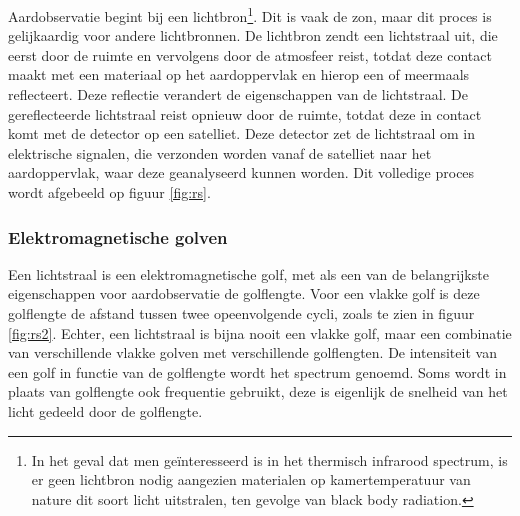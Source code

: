 \documentclass[12pt]{report}
\begin{document}
Aardobservatie begint bij een lichtbron\footnote{In het geval dat men ge\"interesseerd is in het thermisch infrarood spectrum, is er geen lichtbron nodig aangezien materialen op kamertemperatuur van nature dit soort licht uitstralen, ten gevolge van black body radiation.}. Dit is vaak de zon, maar dit proces is gelijkaardig voor andere lichtbronnen. De lichtbron zendt een lichtstraal uit, die eerst door de ruimte en vervolgens door de atmosfeer reist, totdat deze contact maakt met een materiaal op het aardoppervlak en hierop een of meermaals reflecteert. Deze reflectie verandert de eigenschappen van de lichtstraal. De gereflecteerde lichtstraal reist opnieuw door de ruimte, totdat deze in contact komt met de detector op een satelliet. Deze detector zet de lichtstraal om in elektrische signalen, die verzonden worden vanaf de satelliet naar het aardoppervlak, waar deze geanalyseerd kunnen worden. Dit volledige proces wordt afgebeeld op figuur \ref{fig:rs}. 




\subsubsection{Elektromagnetische golven}
Een lichtstraal is een elektromagnetische golf, met als een van de belangrijkste eigenschappen voor aardobservatie de golflengte. Voor een vlakke golf is deze golflengte de afstand tussen twee opeenvolgende cycli, zoals te zien in figuur \ref{fig:rs2}. Echter, een lichtstraal is bijna nooit een vlakke golf, maar een combinatie van verschillende vlakke golven met verschillende golflengten. De intensiteit van een golf in functie van de golflengte wordt het spectrum genoemd. Soms wordt in plaats van golflengte ook frequentie gebruikt, deze is eigenlijk de snelheid van het licht gedeeld door de golflengte.
\end{document}
